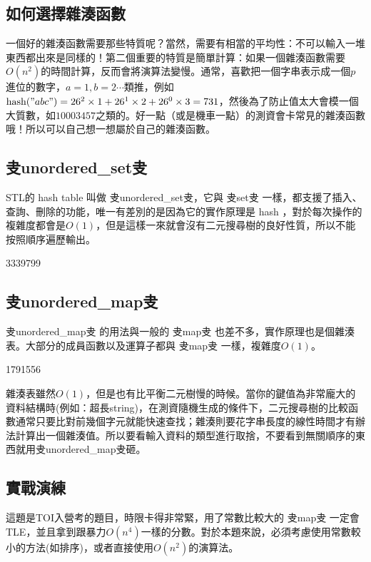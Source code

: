 \documentclass[main.tex]{subfiles}
\begin{document}
\subsection{如何選擇雜湊函數}
一個好的雜湊函數需要那些特質呢？當然，需要有相當的平均性：不可以輸入一堆東西都出來是同樣的！第二個重要的特質是簡單計算：如果一個雜湊函數需要$O(n^2)$的時間計算，反而會將演算法變慢。通常，喜歡把一個字串表示成一個$p$進位的數字，$a = 1, b = 2\cdots$類推，例如$\text{hash}("abc") = 26^2 \times 1 + 26^1 \times 2 + 26^0 \times 3 = 731$，然後為了防止值太大會模一個大質數，如$10003457$之類的。好一點（或是機車一點）的測資會卡常見的雜湊函數哦！所以可以自己想一想屬於自己的雜湊函數。
\subsection{叏unordered\_set叏} 
STL的 hash table 叫做 叏unordered\_set叏，它與 叏set叏 一樣，都支援了插入、查詢、刪除的功能，唯一有差別的是因為它的實作原理是 hash ，對於每次操作的複雜度都會是$O(1)$，但是這樣一來就會沒有二元搜尋樹的良好性質，所以不能按照順序遍歷輸出。
\begin{C++}3339799\end{C++}
\subsection{叏unordered\_map叏}
叏unordered\_map叏 的用法與一般的 叏map叏 也差不多，實作原理也是個雜湊表。大部分的成員函數以及運算子都與 叏map叏 一樣，複雜度$O(1)$。
\begin{C++}1791556\end{C++}
\indent\indent 雜湊表雖然$O(1)$，但是也有比平衡二元樹慢的時候。當你的鍵值為非常龐大的資料結構時(例如：超長string)，在測資隨機生成的條件下，二元搜尋樹的比較函數通常只要比對前幾個字元就能快速查找；雜湊則要花字串長度的線性時間才有辦法計算出一個雜湊值。所以要看輸入資料的類型進行取捨，不要看到無關順序的東西就用叏unordered\_map叏砸。
\subsection{實戰演練}
這題是TOI入營考的題目，時限卡得非常緊，用了常數比較大的 叏map叏 一定會TLE，並且拿到跟暴力$O(n^4)$一樣的分數。對於本題來說，必須考慮使用常數較小的方法(如排序)，或者直接使用$O(n^2)$的演算法。
\end{document}
